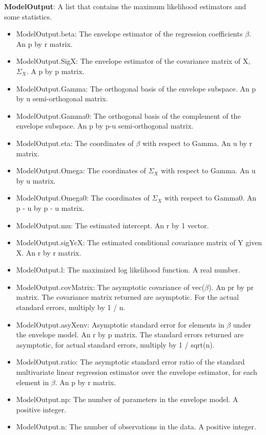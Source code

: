 \documentclass[a4paper,11pt,openany]{memoir}
\begin{document}
\begin{par}
\textbf{ModelOutput}: A list that contains the maximum likelihood estimators and some statistics.
\end{par} \vspace{1em}
\begin{itemize}
\setlength{\itemsep}{-1ex}
   \item ModelOutput.beta: The envelope estimator of the regression coefficients $\beta$. An p by r matrix.
   \item ModelOutput.SigX: The envelope estimator of the covariance matrix of X, $\Sigma_X$.  A p by p matrix.
   \item ModelOutput.Gamma: The orthogonal basis of the envelope subspace. An p by u semi-orthogonal matrix.
   \item ModelOutput.Gamma0: The orthogonal basis of the complement of the envelope subspace.  An p by p-u semi-orthogonal matrix.
   \item ModelOutput.eta: The coordinates of $\beta$ with respect to Gamma. An u by r matrix.
   \item ModelOutput.Omega: The coordinates of $\Sigma_X$ with respect to Gamma. An u by u matrix.
   \item ModelOutput.Omega0: The coordinates of $\Sigma_X$ with respect to Gamma0. An p - u by p - u matrix.
   \item ModelOutput.mu: The estimated intercept.  An r by 1 vector.
   \item ModelOutput.sigYcX: The estimated conditional covariance matrix of Y given X. An r by r matrix.
   \item ModelOutput.l: The maximized log likelihood function.  A real number.
   \item ModelOutput.covMatrix: The asymptotic covariance of vec($\beta$).  An pr by pr matrix.  The covariance matrix returned are asymptotic.  For the actual standard errors, multiply by 1 / n.
   \item ModelOutput.asyXenv: Asymptotic standard error for elements in $\beta$ under the envelope model.  An r by p matrix.  The standard errors returned are asymptotic, for actual standard errors, multiply by 1 / sqrt(n).
   \item ModelOutput.ratio: The asymptotic standard error ratio of the standard multivariate linear regression estimator over the envelope estimator, for each element in $\beta$.  An p by r matrix.
   \item ModelOutput.np: The number of parameters in the envelope model.  A positive integer.
   \item ModelOutput.n: The number of observations in the data.  A positive integer.
\end{itemize}
\end{document}
